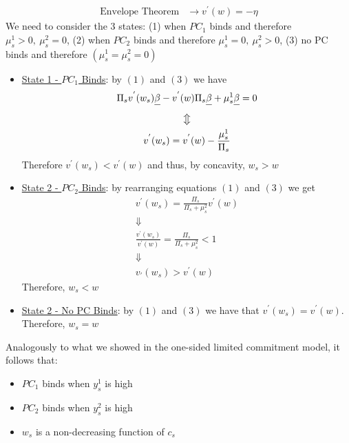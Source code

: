 \documentclass{article}
\begin{document}
\begin{itemize}
\begin{itemize}
\begin{itemize}
\begin{align*}
             \text{Envelope Theorem} &\rightarrow v^{'}(w) = -\eta \tag{3}
         \end{align*}
            We need to consider the 3 states: (1) when $PC_{1}$ binds and therefore $\mu_{s}^{1} > 0, \  \mu_{s}^{2} = 0$, (2) when $PC_{2}$ binds and therefore $\mu_{s}^{1} = 0, \ \mu_{s}^{2} > 0$, (3) no PC binds and therefore $(\mu_{s}^{1} = \mu_{s}^{2} = 0)$
            \begin{itemize}
                \item  \underline{State 1 - $PC_{1}$ Binds}: by $(1)$ and $(3)$ we have
                \begin{gather*}
                    \Pi_{s}v^{'}(w_{s}) \sout{\beta} - v^{'}(w) \Pi_{s} \sout{\beta} + \mu_{s}^{1} \sout{\beta} = 0 \\
                    \big\Updownarrow \\
                    v^{'}(w_{s}) = v^{'}(w) - \frac{\mu_{s}^{1}}{\Pi_{s}}
                \end{gather*}
                Therefore $v^{'}(w_{s}) < v^{'}(w)$ and thus, by concavity, $w_{s} > w$
                \item  \underline{State 2 - $PC_{2}$ Binds}: by rearranging equations $(1)$ and $(3)$ we get
                \begin{gather*}
                    v^{'}(w_{s}) = \frac{\Pi_{s}}{\Pi_{s} + \mu_{s}^{2}} v^{'}(w) \\
                    \Downarrow \\
                    \frac{v^{'}(w_{s})}{v^{'}(w)} = \frac{\Pi_{s}}{\Pi_{s} + \mu_{s}^{2}} < 1 \\
                    \Downarrow \\
                    v_{'}(w_{s}) > v^{'}(w)
                \end{gather*}
                Therefore, $w_{s} < w$
                \item  \underline{State 2 - No PC Binds}: by $(1)$ and $(3)$ we have that $v^{'}(w_{s}) = v^{'}(w)$. Therefore, $w_{s} = w$
            \end{itemize}
        \end{itemize}
        Analogously to what we showed in the one-sided limited commitment model, it follows that:
        \begin{itemize}
            \item  $PC_{1}$ binds when $y_{s}^{1}$ is high
            \item  $PC_{2}$ binds when $y_{s}^{2}$ is high
            \item  $w_{s}$ is a non-decreasing function of $c_{s}$

\end{itemize}
\end{itemize}
\end{itemize}
\end{document}

